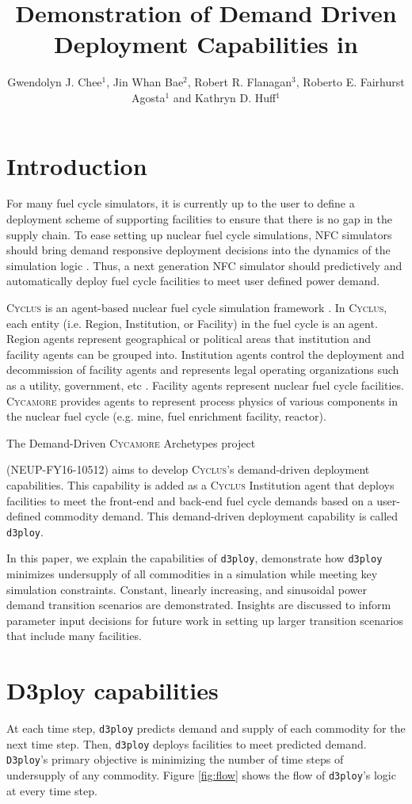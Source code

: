 \documentclass{anstrans}
\title{Demonstration of Demand Driven Deployment Capabilities in \Cyclus}
\author{Gwendolyn J. Chee$^1$, Jin Whan Bae$^2$, Robert R. Flanagan$^3$, Roberto E. Fairhurst Agosta$^1$ and Kathryn D. Huff$^1$}
\institute{
$^1$Dept. of Nuclear, Plasma and Radiological Engineering, University of Illinois at Urbana-Champaign \\
$^2$ Oak Ridge National Laboratory, Oak Ridge, TN, United States \\
$^3$Nuclear Engineering Program, University of South Carolina \\

gchee2@illinois.edu
}
\newcommand{\Cyclus}{\textsc{Cyclus}\xspace}%
\newcommand{\Cycamore}{\textsc{Cycamore}\xspace}%
\newcommand{\deploy}{\texttt{d3ploy}\xspace}%
\newcommand{\Deploy}{\texttt{D3ploy}\xspace}%
\begin{document}
\section{Introduction}
For many fuel cycle simulators, it is currently up to the user 
to define a deployment scheme of supporting facilities to ensure 
that there is no gap in the supply chain. 
To ease setting up nuclear fuel cycle simulations, \gls{NFC}
simulators should bring demand responsive deployment decisions into 
the dynamics of the simulation logic \cite{huff_current_2017}. 
Thus, a next generation \gls{NFC} simulator should predictively and 
automatically deploy fuel cycle facilities to meet user defined 
power demand. 

\Cyclus is an agent-based nuclear fuel cycle simulation framework 
\cite{huff_fundamental_2016}. 
In \Cyclus, each entity (i.e. Region, Institution, or Facility) in the 
fuel cycle is an agent. 
Region agents represent geographical or political areas that institution
and facility agents can be grouped into. 
Institution agents control the 
deployment and decommission of facility agents 
and represents legal operating organizations such as a 
utility, government, etc \cite{huff_fundamental_2016}. 
Facility agents represent nuclear fuel cycle facilities. 
\Cycamore \cite{carlsen_cycamore_2014}
provides agents to represent process physics of various 
components in the nuclear fuel cycle (e.g. mine, fuel enrichment 
facility, reactor). 

The Demand-Driven \Cycamore Archetypes project 

\noindent
(NEUP-FY16-10512) 
aims to develop \Cyclus's demand-driven deployment capabilities. 
This capability is added as a \Cyclus Institution
agent that deploys facilities to meet the front-end and back-end 
fuel cycle demands based on a user-defined commodity demand. 
This demand-driven deployment capability is called 
\deploy. 

In this paper, we explain the capabilities of \deploy, 
demonstrate how \deploy minimizes undersupply of all 
commodities in a simulation while meeting key simulation 
constraints. 
Constant, linearly increasing, and sinusoidal power demand
transition scenarios are demonstrated. 
Insights are discussed to inform parameter 
input decisions for future work in setting up 
larger transition scenarios that include many facilities. 

\section{D3ploy capabilities}
At each time step, \deploy predicts demand and supply of each 
commodity for the next time step.
Then, \deploy deploys facilities to meet predicted demand. 
\Deploy's primary objective is minimizing the number of time 
steps of undersupply of any commodity. 
Figure \ref{fig:flow} shows the flow of \deploy's logic at every time step. 
\end{document}
